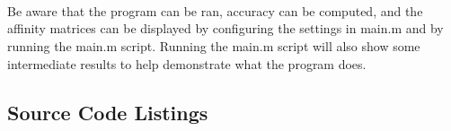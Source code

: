 \documentclass{article}
\begin{document}
~\\~\\~\\
Be aware that the program can be ran, accuracy can be computed, and the affinity matrices can be displayed by configuring the settings in main.m and by running the main.m script. Running the main.m script will also show some intermediate results to help demonstrate what the program does.
\newpage
\begin{appendices}
\section{Source Code Listings}\label{source}
% 







\end{appendices}
\end{document}
